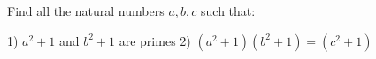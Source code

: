 Find all the natural numbers $a,b,c$ such that:

1) $a^2+1$ and $b^2+1$ are primes
2) $(a^2+1)(b^2+1)=(c^2+1)$